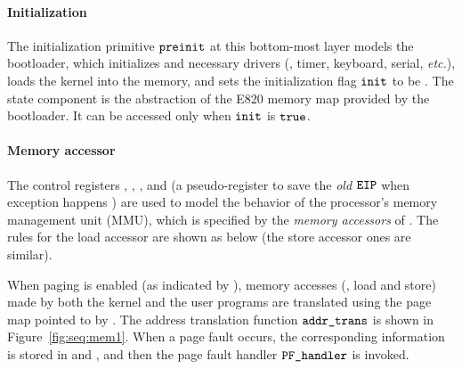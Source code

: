 \paragraph{Initialization} The initialization primitive 
${\texttt{preinit}}$
at this bottom-most layer models the bootloader,
which initializes  and necessary drivers
(\eg, timer, keyboard, serial, {\it etc.}),
loads the kernel into the memory,
and sets the initialization flag ${\texttt{init}}$ to be .
The state component  is the abstraction of the
E820 memory map provided by the bootloader.
It can be accessed only when 
${\texttt{init}}$ is ${\texttt{true}}$.

\paragraph{Memory accessor} 
The control registers , ,  ,
and 
(a pseudo-register to save the \emph{old ${\texttt{EIP}}$} when exception happens
)
are used to model the behavior
of the processor's memory management unit (MMU),
which is specified by the \emph{memory accessors}
of .
The rules for the load accessor are shown as below
(the store accessor ones are similar).

When paging is enabled (as indicated by ),
memory accesses (\ie, load and store) made by both the kernel and the user programs
are translated using the page map pointed to by .
The address translation function
${\texttt{addr\_trans}}$ is
shown in Figure~\ref{fig:seq:mem1}.
When a page fault occurs,
the corresponding information is stored in 
and ,
and then the page fault handler ${\texttt{PF\_handler}}$ is invoked.

